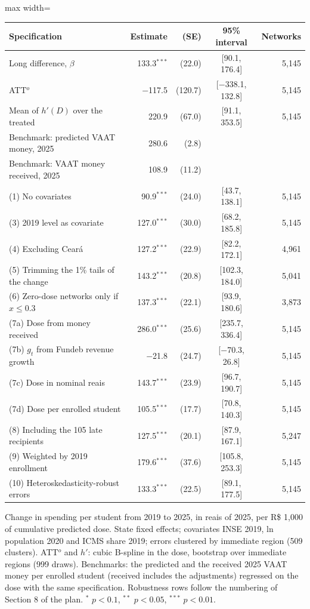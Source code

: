 \begin{adjustbox}{max width=\linewidth}
\begin{tabular}{lrrcr}
\toprule
Specification & Estimate & (SE) & 95\% interval & Networks \\
\midrule
Long difference, $\beta$ & 133.3$^{***}$ & (22.0) & [90.1, 176.4] & 5{,}145 \\
ATT$^o$ & $-$117.5 & (120.7) & [$-$338.1, 132.8] & 5{,}145 \\
Mean of $h'(D)$ over the treated & 220.9 & (67.0) & [91.1, 353.5] & 5{,}145 \\
Benchmark: predicted VAAT money, 2025 & 280.6 & (2.8) & & \\
Benchmark: VAAT money received, 2025 & 108.9 & (11.2) & & \\
\midrule
(1) No covariates & 90.9$^{***}$ & (24.0) & [43.7, 138.1] & 5{,}145 \\
(3) 2019 level as covariate & 127.0$^{***}$ & (30.0) & [68.2, 185.8] & 5{,}145 \\
(4) Excluding Ceará & 127.2$^{***}$ & (22.9) & [82.2, 172.1] & 4{,}961 \\
(5) Trimming the 1\% tails of the change & 143.2$^{***}$ & (20.8) & [102.3, 184.0] & 5{,}041 \\
(6) Zero-dose networks only if $x \le 0.3$ & 137.3$^{***}$ & (22.1) & [93.9, 180.6] & 3{,}873 \\
(7a) Dose from money received & 286.0$^{***}$ & (25.6) & [235.7, 336.4] & 5{,}145 \\
(7b) $g_t$ from Fundeb revenue growth & $-$21.8 & (24.7) & [$-$70.3, 26.8] & 5{,}145 \\
(7c) Dose in nominal reais & 143.7$^{***}$ & (23.9) & [96.7, 190.7] & 5{,}145 \\
(7d) Dose per enrolled student & 105.5$^{***}$ & (17.7) & [70.8, 140.3] & 5{,}145 \\
(8) Including the 105 late recipients & 127.5$^{***}$ & (20.1) & [87.9, 167.1] & 5{,}247 \\
(9) Weighted by 2019 enrollment & 179.6$^{***}$ & (37.6) & [105.8, 253.3] & 5{,}145 \\
(10) Heteroskedasticity-robust errors & 133.3$^{***}$ & (22.5) & [89.1, 177.5] & 5{,}145 \\
\bottomrule
\end{tabular}
\end{adjustbox}
\par\smallskip\begin{minipage}{0.95\linewidth}\footnotesize Change in spending per student from 2019 to 2025, in reais of 2025, per R\$ 1,000 of cumulative predicted dose. State fixed effects; covariates INSE 2019, ln population 2020 and ICMS share 2019; errors clustered by immediate region (509 clusters). ATT$^o$ and $h'$: cubic B-spline in the dose, bootstrap over immediate regions (999 draws). Benchmarks: the predicted and the received 2025 VAAT money per enrolled student (received includes the adjustments) regressed on the dose with the same specification. Robustness rows follow the numbering of Section 8 of the plan. $^{*}$ $p<0.1$, $^{**}$ $p<0.05$, $^{***}$ $p<0.01$.\end{minipage}
